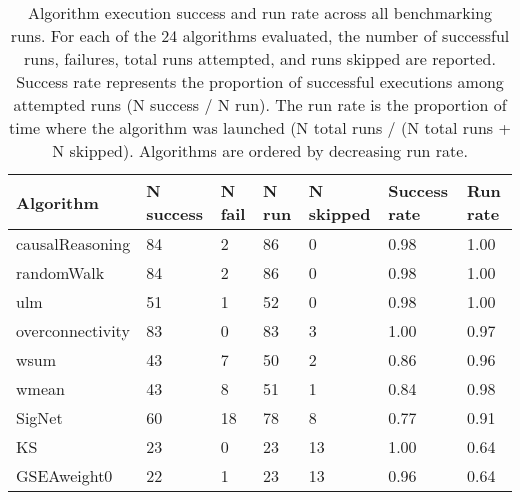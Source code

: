 \begin{table}[]
\caption{Algorithm execution success and run rate across all benchmarking runs. For each of the 24 algorithms evaluated, the number of successful runs, failures, total runs attempted, and runs skipped are reported. Success rate represents the proportion of successful executions among attempted runs (N success / N run). The run rate is the proportion of time where the algorithm was launched (N total runs / (N total runs + N skipped). Algorithms are ordered by decreasing run rate.}
\label{tab:table4.2}
\begin{tabular}{lllllll}
\hline
\textbf{Algorithm} & \textbf{N success} & \textbf{N fail} & \textbf{N run} & \textbf{N skipped} & \textbf{Success rate} & \textbf{Run rate} \\ \hline
causalReasoning    & 84                 & 2               & 86             & 0                  & 0.98                  & 1.00              \\
randomWalk         & 84                 & 2               & 86             & 0                  & 0.98                  & 1.00              \\
ulm                & 51                 & 1               & 52             & 0                  & 0.98                  & 1.00              \\
overconnectivity   & 83                 & 0               & 83             & 3                  & 1.00                  & 0.97              \\
wsum               & 43                 & 7               & 50             & 2                  & 0.86                  & 0.96              \\
wmean              & 43                 & 8               & 51             & 1                  & 0.84                  & 0.98              \\
SigNet             & 60                 & 18              & 78             & 8                  & 0.77                  & 0.91              \\
KS                 & 23                 & 0               & 23             & 13                 & 1.00                  & 0.64              \\
GSEAweight0        & 22                 & 1               & 23             & 13                 & 0.96                  & 0.64              \\

\end{tabular}
\end{table}
